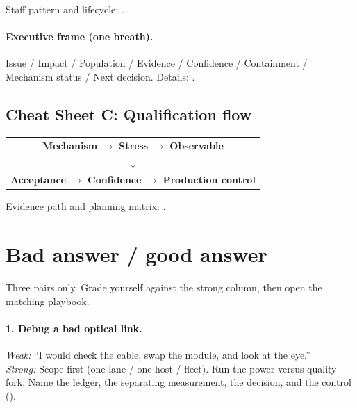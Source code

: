 Staff pattern and lifecycle: .

\paragraph{Executive frame (one breath).}
Issue / Impact / Population / Evidence / Confidence / Containment /
Mechanism status / Next decision.
Details: .

\clearpage
\subsection{Cheat Sheet C: Qualification flow}
\label{sec:cheat-qual}

\begin{center}
\small
\begin{tabular}{@{}c@{}}
\textbf{Mechanism} $\rightarrow$ \textbf{Stress} $\rightarrow$
\textbf{Observable} \\[0.4em]
$\downarrow$ \\[0.2em]
\textbf{Acceptance} $\rightarrow$ \textbf{Confidence} $\rightarrow$
\textbf{Production control}
\end{tabular}
\end{center}

Evidence path and planning matrix:
.


\clearpage
\section{Bad answer / good answer}
\label{sec:interview-bad-good}

Three pairs only. Grade yourself against the strong column, then open the
matching playbook.

\paragraph{1. Debug a bad optical link.}
\textit{Weak:} ``I would check the cable, swap the module, and look at the
eye.''\\
\textit{Strong:} Scope first (one lane / one host / fleet). Run the
power-versus-quality fork. Name the ledger, the separating measurement, the
decision, and the control ().

